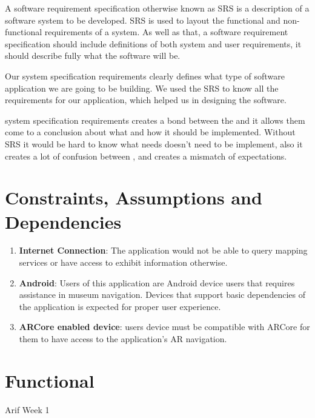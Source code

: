 A software requirement specification otherwise known as SRS is a description of a software system to be developed. SRS is used to layout the functional and non-functional requirements of a system. As well as that, a software requirement specification should include definitions of both system and user requirements, it should describe fully what the software will be. 

Our system specification requirements clearly defines what type of software application we are going to be building. We used the SRS to know all the requirements for our application, which helped us in designing the software. 

 system specification requirements creates a bond between the  and  it allows them come to a conclusion about what  and how it should be implemented. Without  SRS it would be hard to know what needs doesn't need to be implement, also it creates a lot of  confusion between , and creates a mismatch of expectations.  

\section*{Constraints, Assumptions and Dependencies}
\begin{enumerate}
    \item \textbf{Internet Connection}: The application would not be able to query mapping services or have access to exhibit information otherwise.
    \item \textbf{Android}: Users of this application are Android device users that requires assistance in museum navigation. Devices that support basic dependencies of the application is expected for proper user experience.
    \item \textbf{ARCore enabled device}: users device must be compatible with ARCore for them to have access to the application's AR navigation.
\end{enumerate}


\section{Functional}
Arif Week 1

